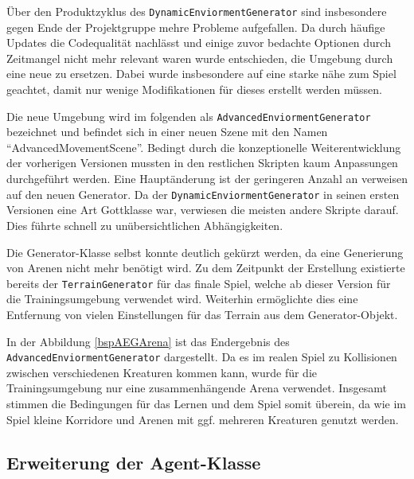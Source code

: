 Über den Produktzyklus des \texttt{DynamicEnviormentGenerator} sind insbesondere gegen Ende der Projektgruppe mehre Probleme aufgefallen. Da durch häufige Updates die Codequalität nachlässt und einige zuvor bedachte Optionen durch Zeitmangel nicht mehr relevant waren wurde entschieden, die Umgebung durch eine neue zu ersetzen. Dabei wurde insbesondere auf eine starke nähe zum Spiel geachtet, damit nur wenige Modifikationen für dieses erstellt werden müssen.

Die neue Umgebung wird im folgenden als \texttt{AdvancedEnviormentGenerator} bezeichnet und befindet sich in einer neuen Szene mit den Namen \enquote{AdvancedMovementScene}. Bedingt durch die konzeptionelle Weiterentwicklung der vorherigen Versionen mussten in den restlichen Skripten kaum Anpassungen durchgeführt werden. Eine Hauptänderung ist der geringeren Anzahl an verweisen auf den neuen Generator. Da der \texttt{DynamicEnviormentGenerator} in seinen ersten Versionen eine Art Gottklasse war, verwiesen die meisten andere Skripte darauf. Dies führte schnell zu unübersichtlichen Abhängigkeiten.

Die Generator-Klasse selbst konnte deutlich gekürzt werden, da eine Generierung von Arenen nicht mehr benötigt wird. Zu dem Zeitpunkt der Erstellung existierte bereits der \texttt{TerrainGenerator} für das finale Spiel, welche ab dieser Version für die Trainingsumgebung verwendet wird. Weiterhin ermöglichte dies eine Entfernung von vielen Einstellungen für das Terrain aus dem Generator-Objekt.

In der Abbildung \ref{bspAEGArena} ist das Endergebnis des \texttt{AdvancedEnviormentGenerator} dargestellt. Da es im realen Spiel zu Kollisionen zwischen verschiedenen Kreaturen kommen kann, wurde für die Trainingsumgebung nur eine zusammenhängende Arena verwendet. Insgesamt stimmen die Bedingungen für das Lernen und dem Spiel somit überein, da wie im Spiel kleine Korridore und Arenen mit ggf. mehreren Kreaturen genutzt werden.
\subsection{Erweiterung der Agent-Klasse}

